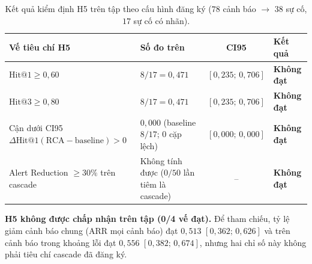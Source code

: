 \begin{table}[htbp]
  \centering
  \caption[Kiểm định giả thuyết H5 trên tập test theo bản đăng ký]{Kết quả kiểm định H5 trên tập  theo cấu hình đăng ký ($78$ cảnh báo \CTAV{} $\to$ $38$ sự cố, $17$ sự cố có nhãn).}
  \label{tab:ch5-h5}
  \scriptsize
  \renewcommand{\arraystretch}{1.15}
  \begin{tabularx}{\linewidth}{@{}Y >{\raggedright\arraybackslash}p{4.4cm} c l@{}}
    \toprule
    \textbf{Vế tiêu chí H5} & \textbf{Số đo trên } & \textbf{CI95} & \textbf{Kết quả} \\
    \midrule
    $\text{Hit@1} \ge 0{,}60$ & $8 / 17 = 0{,}471$ & $[0{,}235;\, 0{,}706]$ & \textbf{Không đạt} \\
    $\text{Hit@3} \ge 0{,}80$ & $8 / 17 = 0{,}471$ & $[0{,}235;\, 0{,}706]$ & \textbf{Không đạt} \\
    Cận dưới CI95 $\Delta\text{Hit@1}(\text{RCA}-\text{baseline}) > 0$ & $0{,}000$ (baseline $8/17$; $0$ cặp lệch) & $[0{,}000;\, 0{,}000]$ & \textbf{Không đạt} \\
    Alert Reduction $\ge 30\%$ trên cascade & Không tính được ($0/50$ lần tiêm là cascade) & -- & \textbf{Không đạt} \\
    \bottomrule
  \end{tabularx}
\end{table}

\textbf{H5 không được chấp nhận trên tập  (0/4 vế đạt).} Để tham chiếu, tỷ lệ giảm cảnh báo chung (ARR mọi cảnh báo) đạt $0{,}513$ $[0{,}362;\, 0{,}626]$ và trên cảnh báo trong khoảng lỗi đạt $0{,}556$ $[0{,}382;\, 0{,}674]$, nhưng hai chỉ số này không phải tiêu chí cascade đã đăng ký.

